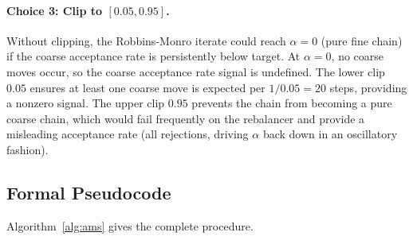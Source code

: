 \paragraph{Choice 3: Clip to $[0.05, 0.95]$.}
Without clipping, the Robbins-Monro iterate could reach $\alpha = 0$ (pure
fine chain) if the coarse acceptance rate is persistently below target.
At $\alpha = 0$, no coarse moves occur, so the coarse acceptance rate signal
is undefined.
The lower clip $0.05$ ensures at least one coarse move is expected per
$1/0.05 = 20$ steps, providing a nonzero signal.
The upper clip $0.95$ prevents the chain from becoming a pure coarse chain,
which would fail frequently on the rebalancer and provide a misleading
acceptance rate (all rejections, driving $\alpha$ back down in an oscillatory
fashion).

\subsection{Formal Pseudocode}

Algorithm~\ref{alg:ams} gives the complete \ams{} procedure.

